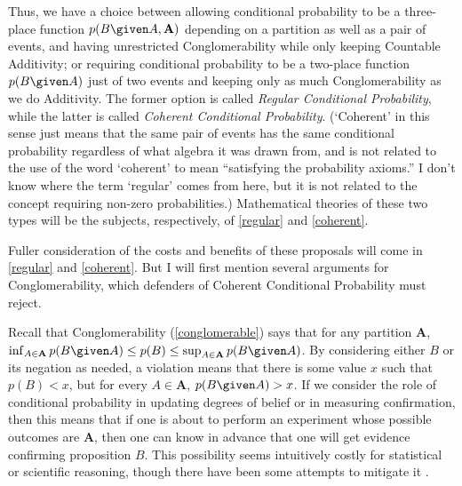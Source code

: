 Thus, we have a choice between allowing conditional probability to be a three-place function $p(B \given A,\mathbf{A})$ depending on a partition as well as a pair of events, and having unrestricted Conglomerability while only keeping Countable Additivity; or requiring conditional probability to be a two-place function $p(B \given A)$ just of two events and keeping only as much Conglomerability as we do Additivity. The former option is called \textit{Regular Conditional Probability}, while the latter is called \textit{Coherent Conditional Probability}. (`Coherent' in this sense just means that the same pair of events has the same conditional probability regardless of what algebra it was drawn from, and is not related to the use of the word `coherent' to mean ``satisfying the probability axioms.'' I don't know where the term `regular' comes from here, but it is not related to the concept requiring non-zero probabilities.) Mathematical theories of these two types will be the subjects, respectively, of \autoref{regular} and \autoref{coherent}.

Fuller consideration of the costs and benefits of these proposals will come in \autoref{regular} and \autoref{coherent}. But I will first mention several arguments for Conglomerability, which defenders of Coherent Conditional Probability must reject.

Recall that Conglomerability (\autoref{conglomerable}) says that for any partition $\mathbf{A}$, $\inf_{A\in\mathbf{A}}p(B \given A)\leq p(B)\leq\sup_{A\in\mathbf{A}}p(B \given A)$. By considering either $B$ or its negation as needed, a violation means that there is some value $x$ such that $p(B)<x$, but for every $A\in\mathbf{A}$, $p(B \given A)>x$. If we consider the role of conditional probability in updating degrees of belief or in measuring confirmation, then this means that if one is about to perform an experiment whose possible outcomes are $\mathbf{A}$, then one can know in advance that one will get evidence confirming proposition $B$. This possibility seems intuitively costly for statistical or scientific reasoning, though there have been some attempts to mitigate it \citep{foregone}.

